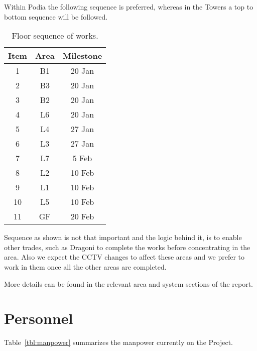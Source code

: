 Within Podia the following sequence is preferred, whereas in the Towers a top to bottom sequence will be followed.

\begin{table}[htbp]
\centering
\begin{tabular}{ccc}
\toprule
Item  &Area   & Milestone \\
\midrule
1     & B1 & 20 Jan\\
2     & B3 & 20 Jan \\
3     & B2 & 20 Jan \\
4     & L6 & 20 Jan\\
5     & L4 & 27 Jan\\
6     & L3 & 27 Jan\\
7     & L7 &  5 Feb\\
8     & L2 & 10 Feb\\
9     & L1 & 10 Feb\\
10    & L5 & 10 Feb\\
11    & GF & 20 Feb\\
\bottomrule
\end{tabular}
\caption{Floor sequence of works.}
\end{table}

Sequence as shown is not that important and the logic behind it, is to enable other trades, such as Dragoni to complete the
works before concentrating in the area. Also we expect the CCTV
changes to affect these areas and we prefer to work in them
once all the other areas are completed.

More details can be found in the relevant area and system sections of the report.


\section{Personnel}


 Table~\ref{tbl:manpower} summarizes the manpower currently on the Project. 


